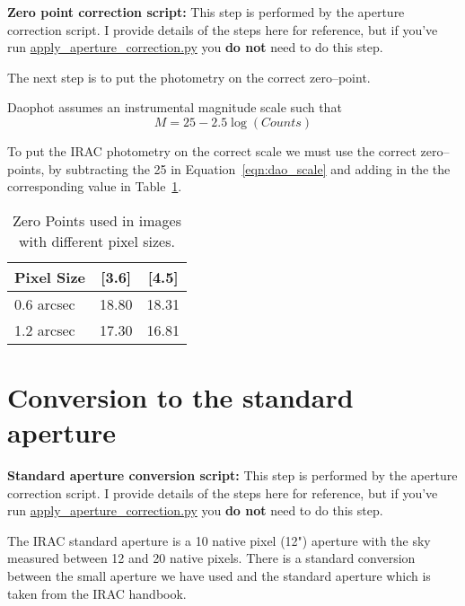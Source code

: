 \documentclass[11pt]{article}
\begin{document}
{\bf Zero point correction script:} This step is performed by the aperture correction script. I provide details of the steps here for reference, but if you've run \href{https://github.com/vickyscowcroft/smhash_code/blob/master/apply\_aperture\_correction.py}{apply\_aperture\_correction.py} you {\bf do not} need to do this step.

The next step is to put the photometry on the correct zero--point.

Daophot assumes an instrumental magnitude scale such that 
\begin{equation}
M = 25 - 2.5 \log(Counts)
\end{equation}
\label{eqn:dao_scale}

To put the IRAC photometry on the correct scale we must use the correct zero--points, by subtracting the 25 in Equation~\ref{eqn:dao_scale} and adding in the the corresponding value in Table~\ref{tab:zero_points}.

\begin{table}
\begin{center}
\begin{tabular}{l c c} \hline
Pixel Size & [3.6] & [4.5] \\ \hline \hline 
0.6 arcsec & 18.80 & 18.31 \\
1.2 arcsec & 17.30 & 16.81 \\
\hline
\end{tabular}
\caption{Zero Points used in images with different pixel sizes.}
\label{tab:zero_points}
\end{center}
\end{table}


\section{Conversion to the standard aperture}
\label{sec:standard_aperture}

{\bf Standard aperture conversion script:} This step is performed by the aperture correction script. I provide details of the steps here for reference, but if you've run \href{https://github.com/vickyscowcroft/smhash_code/blob/master/apply_aperture_correction.py}{apply\_aperture\_correction.py} you {\bf do not} need to do this step.

The IRAC standard aperture is a 10 native pixel (12") aperture with the sky measured between 12 and 20 native pixels. There is a standard conversion between the small aperture we have used and the standard aperture which is taken from the IRAC handbook.
\end{document}
